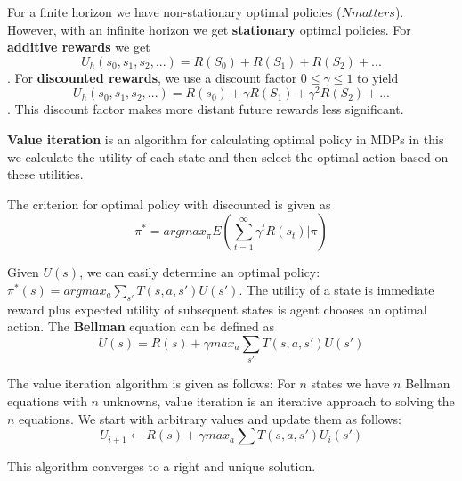 \documentclass{article}
\begin{document}
For a finite horizon we have non-stationary optimal policies ($N matters$). However, with an infinite horizon we get \textbf{stationary} optimal policies. For \textbf{additive rewards} we get $$U_h(s_0, s_1, s_2, ...) = R(S_0) + R(S_1) + R(S_2) + ...$$. For \textbf{discounted rewards}, we use a discount factor $0 \leq \gamma \leq 1$ to yield $$U_h(s_0,s_1,s_2,...) = R(s_0) + \gamma R(S_1) + \gamma^2 R(S_2) + ...$$. This discount factor makes more distant future rewards less significant. 

\textbf{Value iteration} is an algorithm for calculating optimal policy in MDPs in this we calculate the utility of each state and then select the optimal action based on these utilities. 

The criterion for optimal policy with discounted is given as $$\pi^* = argmax_{\pi} E (\sum_{t=1}^{\infty} \gamma^t R(s_t)|\pi)$$ 

Given $U(s)$, we can easily determine an optimal policy: $\pi^* (s) = argmax_{a} \sum_{s'} T(s,a,s')U(s')$. The utility of a state is immediate reward plus expected utility of subsequent states is agent chooses an optimal action. The \textbf{Bellman} equation can be defined as $$U(s) = R(s) + \gamma max_{a} \sum_{s'} T(s,a,s')U(s')$$

The value iteration algorithm is given as follows: For $n$ states we have $n$ Bellman equations with $n$ unknowns, value iteration is an iterative approach to solving the $n$ equations. We start with arbitrary values and update them as follows: $$U_{i+1} \leftarrow R(s) + \gamma max_a \sum T(s,a,s')U_i (s')$$

This algorithm converges to a right and unique solution. 
\end{document}
